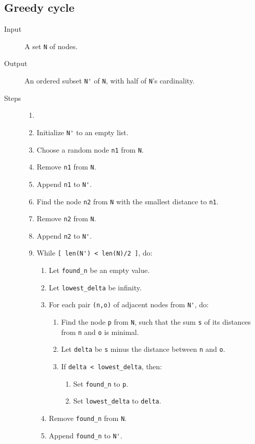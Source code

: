 \documentclass[14pt]{article}
\begin{document}
\subsection{Greedy cycle}
\begin{description}
	\item [Input] A set \verb`N` of nodes.
	\item [Output] An ordered subset \verb`N'` of \verb`N`, with half of
		\verb`N`'s cardinality.
	\item [Steps]
		\begin{enumerate}\item []
			\item Initialize \verb`N'` to an empty list.
			\item Choose a random node \verb`n1` from \verb`N`.
			\item Remove \verb`n1` from \verb`N`.
			\item Append \verb`n1` to \verb`N'`.
			\item Find the node \verb`n2` from \verb`N` with the smallest
				distance to \verb`n1`.
			\item Remove \verb`n2` from \verb`N`.
			\item Append \verb`n2` to \verb`N'`.
			\item While \verb`[ len(N') < len(N)/2 ]`, do:
				\begin{enumerate}
					\item Let \verb`found_n` be an empty value.
					\item Let \verb`lowest_delta` be infinity.
					\item For each pair \verb`(n,o)` of adjacent nodes from \verb`N'`, do:
						\begin{enumerate}
							\item Find the node \verb`p` from \verb`N`, such
								that the sum \verb`s` of its distances from
								\verb`n` and \verb`o` is minimal.
							\item Let \verb`delta` be \verb`s` minus the
								distance between \verb`n` and \verb`o`.
							\item If \verb`delta < lowest_delta`, then:
								\begin{enumerate}
									\item Set \verb`found_n` to \verb`p`.
									\item Set \verb`lowest_delta` to \verb`delta`.
								\end{enumerate}
						\end{enumerate}
					\item Remove \verb`found_n` from \verb`N`.
					\item Append \verb`found_n` to \verb`N'`.
				\end{enumerate}
		\end{enumerate}
\end{description}
\end{document}
